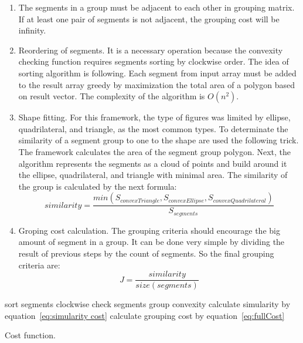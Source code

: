\documentclass{lutmscthesis}[2010/09/22]
\begin{document}
\begin{enumerate}
    \item The segments in a group must be adjacent to each other in grouping matrix. If at least one pair of segments is not adjacent, the grouping cost will be infinity.
    \item  Reordering of segments. It is a necessary operation because the convexity checking function requires segments sorting by clockwise order. The idea of sorting algorithm is following. Each segment from input array must be added to the result array greedy by maximization the total area of a polygon based on result vector. The complexity of the algorithm is $O(n^2)$.
    \item Shape fitting. For this framework, the type of figures was limited by ellipse, quadrilateral, and triangle, as the most common types. To determinate the similarity of a segment group to one to the shape are used the following trick. The framework calculates the area of the segment group polygon. Next, the algorithm represents the segments as a cloud of points and build around it the ellipse, quadrilateral, and triangle with minimal area. The similarity of the group is calculated by the next formula: 
    \begin{equation}
        similarity = \frac{min(S_{convexTriangle},S_{convexEllipse},S_{convexQuadrilateral})}{S_{segments}}
        \label{eq:simularity cost}
    \end{equation}
    \item Groping cost calculation.  The grouping criteria should encourage the big amount of segment in a group. It can be done very simple by dividing the result of previous steps by the count of segments. So the final grouping criteria are:
    \begin{equation}
        J = \frac{similarity}{size(segments)}
    \label{eq:fullCost}
    \end{equation}
\end{enumerate}


\begin{algorithm} [H]
    \SetAlgoLined
     {
     \Return {$\infty$ }
    }
    sort segments clockwise\;
    check segments group convexity\;
     {
        \Return {$\infty$ }
    }
    calculate simularity by equation~\ref{eq:simularity cost}\;
    calculate grouping cost by equation~\ref{eq:fullCost}\;
\caption{Cost function.}\label{alg:CostFunction}
\end{algorithm}
\end{document}
